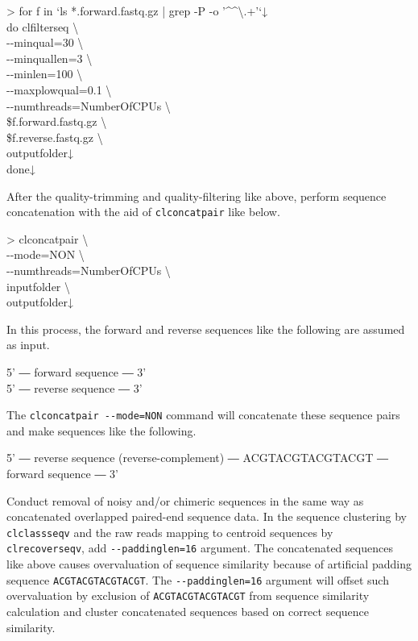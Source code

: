 \documentclass[titlepage,10pt,a4paper,english]{jsbook}
\newenvironment{pre}{\begin{leftbar}\raggedright\ttfamily\footnotesize\setlength{\baselineskip}{1.4em}}{\end{leftbar}\vspace{-1em}}
\newenvironment{cmd}{\begin{oframed}\raggedright\ttfamily\footnotesize\setlength{\baselineskip}{1.4em}}{\end{oframed}\vspace{-1em}}
\begin{document}
\begin{cmd}
{\textgreater} for f in `ls *.forward.fastq.gz | grep -P -o '{\textasciicircum}{\lbrack}{\textasciicircum}{\textbackslash}.{\rbrack}+'`↓\\
do clfilterseq {\textbackslash}\\
{-}{-}minqual=30 {\textbackslash}\\
{-}{-}minquallen=3 {\textbackslash}\\
{-}{-}minlen=100 {\textbackslash}\\
{-}{-}maxplowqual=0.1 {\textbackslash}\\
{-}{-}numthreads=NumberOfCPUs {\textbackslash}\\
\$f.forward.fastq.gz {\textbackslash}\\
\$f.reverse.fastq.gz {\textbackslash}\\
outputfolder↓\\
done↓
\end{cmd}

After the quality-trimming and quality-filtering like above, perform sequence concatenation with the aid of \texttt{clconcatpair} like below.

\begin{cmd}
{\textgreater} clconcatpair {\textbackslash}\\
{-}{-}mode=NON {\textbackslash}\\
{-}{-}numthreads=NumberOfCPUs {\textbackslash}\\
inputfolder {\textbackslash}\\
outputfolder↓
\end{cmd}

In this process, the forward and reverse sequences like the following are assumed as input.

\begin{pre}
5' ― forward sequence ― 3'\\
5' ― reverse sequence ― 3'
\end{pre}

The \texttt{clconcatpair {-}{-}mode=NON} command will concatenate these sequence pairs and make sequences like the following.

\begin{pre}
5' ― reverse sequence (reverse-complement) ― ACGTACGTACGTACGT ― forward sequence ― 3'
\end{pre}

Conduct removal of noisy and/or chimeric sequences in the same way as concatenated overlapped paired-end sequence data.
In the sequence clustering by \texttt{clclassseqv} and the raw reads mapping to centroid sequences by \texttt{clrecoverseqv}, add \texttt{{-}{-}paddinglen=16} argument.
The concatenated sequences like above causes overvaluation of sequence similarity because of artificial padding sequence \texttt{ACGTACGTACGTACGT}.
The \texttt{{-}{-}paddinglen=16} argument will offset such overvaluation by exclusion of \texttt{ACGTACGTACGTACGT} from sequence similarity calculation and cluster concatenated sequences based on correct sequence similarity.
\end{document}
